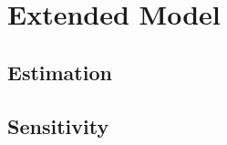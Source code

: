 \section{Extended Model}
\label{sec:extended_model}

\blindtext

\subsection{Estimation}
\label{sec:estimation}

\blindtext

\begin{table}
  \centering
  \caption{Table 3 - Parameterization}
  \label{tab:estimation}
\end{table}

\subsection{Sensitivity}
\label{sec:sensitivity}

\blindtext


